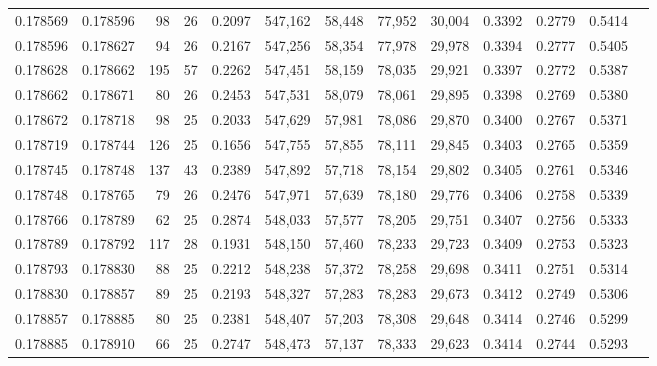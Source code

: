 \begin{tabular}{rrrrrrrrrrrrr}
0.178569 & 0.178596 &  98 &  26 &                                     0.2097 & 547,162 &  58,448 &  77,952 &  30,004 & 0.3392 & 0.2779 & 0.5414 \\
0.178596 & 0.178627 &  94 &  26 &                                     0.2167 & 547,256 &  58,354 &  77,978 &  29,978 & 0.3394 & 0.2777 & 0.5405 \\
0.178628 & 0.178662 & 195 &  57 &                                     0.2262 & 547,451 &  58,159 &  78,035 &  29,921 & 0.3397 & 0.2772 & 0.5387 \\
0.178662 & 0.178671 &  80 &  26 &                                     0.2453 & 547,531 &  58,079 &  78,061 &  29,895 & 0.3398 & 0.2769 & 0.5380 \\
0.178672 & 0.178718 &  98 &  25 &                                     0.2033 & 547,629 &  57,981 &  78,086 &  29,870 & 0.3400 & 0.2767 & 0.5371 \\
0.178719 & 0.178744 & 126 &  25 &                                     0.1656 & 547,755 &  57,855 &  78,111 &  29,845 & 0.3403 & 0.2765 & 0.5359 \\
0.178745 & 0.178748 & 137 &  43 &                                     0.2389 & 547,892 &  57,718 &  78,154 &  29,802 & 0.3405 & 0.2761 & 0.5346 \\
0.178748 & 0.178765 &  79 &  26 &                                     0.2476 & 547,971 &  57,639 &  78,180 &  29,776 & 0.3406 & 0.2758 & 0.5339 \\
0.178766 & 0.178789 &  62 &  25 &                                     0.2874 & 548,033 &  57,577 &  78,205 &  29,751 & 0.3407 & 0.2756 & 0.5333 \\
0.178789 & 0.178792 & 117 &  28 &                                     0.1931 & 548,150 &  57,460 &  78,233 &  29,723 & 0.3409 & 0.2753 & 0.5323 \\
0.178793 & 0.178830 &  88 &  25 &                                     0.2212 & 548,238 &  57,372 &  78,258 &  29,698 & 0.3411 & 0.2751 & 0.5314 \\
0.178830 & 0.178857 &  89 &  25 &                                     0.2193 & 548,327 &  57,283 &  78,283 &  29,673 & 0.3412 & 0.2749 & 0.5306 \\
0.178857 & 0.178885 &  80 &  25 &                                     0.2381 & 548,407 &  57,203 &  78,308 &  29,648 & 0.3414 & 0.2746 & 0.5299 \\
0.178885 & 0.178910 &  66 &  25 &                                     0.2747 & 548,473 &  57,137 &  78,333 &  29,623 & 0.3414 & 0.2744 & 0.5293 \\

\end{tabular}
